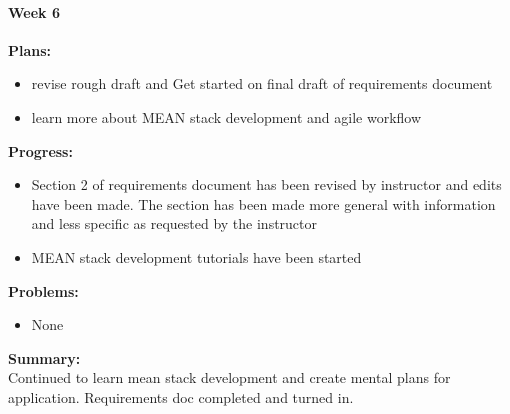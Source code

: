 \paragraph{Week 6}
\begin{adjustwidth}{2.5em}{0pt}
    \vspace{-0.5cm}\textbf{Plans:}
    \vspace{-0.5cm}
    \begin{itemize}
        \item revise rough draft and Get started on final draft of requirements document
        \item learn more about MEAN stack development and agile workflow 
    \end{itemize} 
    \vspace{-0.3cm}\textbf{Progress:}
    \vspace{-0.5cm}
    \begin{itemize}
        \item Section 2 of requirements document has been revised by instructor and edits have been made. The section has been made more general with information and less specific as requested by the instructor
        \item MEAN stack development tutorials have been started

    \end{itemize} 
    \vspace{-0.3cm}\textbf{Problems:}
    \vspace{-0.5cm}
    \begin{itemize}
        \item None
    \end{itemize}  
    \vspace{-0.3cm}\noindent\textbf{Summary:}\\
    \noindent Continued to learn mean stack development and create mental plans for application. Requirements doc completed and turned in.
\end{adjustwidth} 
